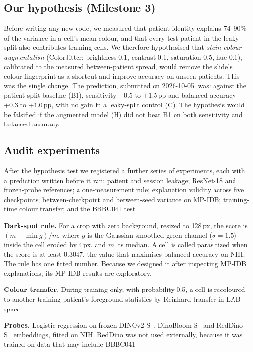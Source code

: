 \documentclass[conference]{IEEEtran}
\newcommand{\pp}{\,pp}
\begin{document}
\subsection{Our hypothesis (Milestone 3)}
\label{sec:hypdef}
Before writing any new code, we measured that patient identity explains 74--90\% of the variance in a cell's mean colour, and that every test patient in the leaky split also contributes training cells. We therefore hypothesised that \emph{stain-colour augmentation} (ColorJitter: brightness 0.1, contrast 0.1, saturation 0.5, hue 0.1), calibrated to the measured between-patient spread, would remove the slide's colour fingerprint as a shortcut and improve accuracy on unseen patients. This was the single change. The prediction, submitted on 2026-10-05, was: against the patient-split baseline (B1), sensitivity $+0.5$ to $+1.5$\pp{} and balanced accuracy $+0.3$ to $+1.0$\pp{}, with no gain in a leaky-split control (C). The hypothesis would be falsified if the augmented model (H) did not beat B1 on both sensitivity and balanced accuracy.

\subsection{Audit experiments}
After the hypothesis test we registered a further series of experiments, each with a prediction written before it ran: patient and session leakage; ResNet-18 and frozen-probe references; a one-measurement rule; explanation validity across five checkpoints; between-checkpoint and between-seed variance on MP-IDB; training-time colour transfer; and the BBBC041 test.

\textbf{Dark-spot rule.} For a crop with zero background, resized to 128\,px, the score is $(m - \min g)/m$, where $g$ is the Gaussian-smoothed green channel ($\sigma = 1.5$) inside the cell eroded by 4\,px, and $m$ its median. A cell is called parasitized when the score is at least 0.3047, the value that maximises balanced accuracy on NIH. The rule has one fitted number. Because we designed it after inspecting MP-IDB explanations, its MP-IDB results are exploratory.

\textbf{Colour transfer.} During training only, with probability 0.5, a cell is recoloured to another training patient's foreground statistics by Reinhard transfer in LAB space~\cite{reinhard2001}.

\textbf{Probes.} Logistic regression on frozen DINOv2-S~\cite{oquab2023}, DinoBloom-S~\cite{koch2024} and RedDino-S~\cite{zedda2025} embeddings, fitted on NIH. RedDino was not used externally, because it was trained on data that may include BBBC041.
\end{document}
